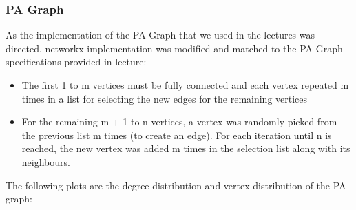 \documentclass[11pt,a4paper,notitlepage]{article}
\begin{document}
\subsubsection*{PA Graph}
As the implementation of the PA Graph that we used in the lectures was directed, networkx implementation was modified and matched to the PA Graph specifications provided in lecture:
\begin{itemize}
    \item The first 1 to m vertices must be fully connected and  each vertex repeated m times in a list for selecting the new edges for the remaining vertices
    \item For the remaining m + 1 to n vertices, a vertex was  randomly picked from the previous list m times (to create an edge). For each iteration until n is reached, the new vertex was added m times in the selection list along with its neighbours.
\end{itemize} 
The following plots are the degree distribution and vertex distribution of the PA graph:
\end{document}
